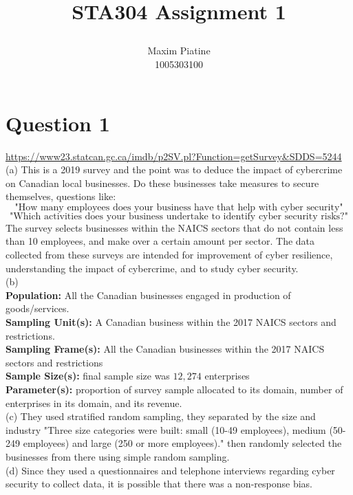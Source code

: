 \documentclass[11pt]{article}
\title{\textbf{STA304 Assignment 1}
\author{Maxim Piatine\\1005303100}}
\date{}
\theoremstyle{claim}
\begin{document}
\maketitle
\section*{Question 1}
\url{https://www23.statcan.gc.ca/imdb/p2SV.pl?Function=getSurvey&SDDS=5244}
\vspace{5mm}
\\(a) This is a 2019 survey and the point was to deduce the impact of cybercrime on Canadian local businesses. Do these businesses take measures to secure themselves, questions like: 
\[\text{"How many employees does your business have that help with cyber security"}\]
\[\text{"Which activities does your business undertake to identify cyber security risks?"}\]
The survey selects businesses within the NAICS sectors that do not contain less than 10 employees, and make over a certain amount per sector. The data collected from these surveys are intended for improvement of cyber resilience, understanding the impact of cybercrime, and to study cyber security.
\vspace{5mm}
\\(b) 
\vspace{2mm}
\\\textbf{Population:} All the Canadian businesses engaged in production of goods/services. 
\vspace{2mm}
\\\textbf{Sampling Unit(s):} A Canadian business within the 2017 NAICS sectors and restrictions.
\vspace{2mm}
\\\textbf{Sampling Frame(s):} All the Canadian businesses within the 2017 NAICS sectors and restrictions
\vspace{2mm}
\\\textbf{Sample Size(s):} final sample size was $12,274$ enterprises
\vspace{2mm}
\\\textbf{Parameter(s):} proportion of survey sample allocated to its domain, number of enterprises in its domain, and its revenue.
\vspace{5mm}
\\(c) They used stratified random sampling, they separated by the size and industry "Three size categories were built: small (10-49 employees), medium (50-249 employees) and large (250 or more employees)." then randomly selected the businesses from there using simple random sampling. 
\vspace{5mm}
\\(d) Since they used a questionnaires and telephone interviews regarding cyber security to collect data, it is possible that there was a non-response bias. 
\end{document}
